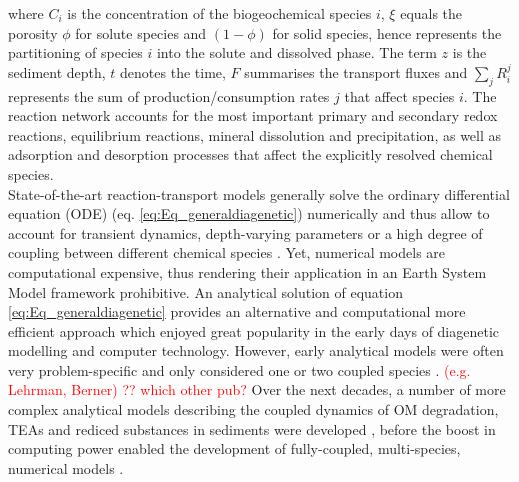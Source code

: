 \documentclass[gmd, manuscript]{copernicus}
\begin{document}
where $C_i$ is the concentration of the biogeochemical species $i$, $\xi$ equals the porosity $\phi$ for solute species and $(1-\phi)$ for solid species, hence represents the partitioning of species $i$ 
into the solute and dissolved phase. The term $z$ is the sediment depth, $t$ denotes the time, $F$ summarises the transport fluxes and $\sum_j R_i^j$ represents the sum of production/consumption rates $j$ 
that affect species $i$. The reaction network accounts for the most important primary and secondary redox reactions, equilibrium reactions, mineral dissolution and precipitation, as well as adsorption 
and desorption processes that affect the explicitly resolved chemical species.\\
State-of-the-art reaction-transport models generally solve the ordinary differential equation (ODE) (eq. \ref{eq:Eq_generaldiagenetic}) numerically and thus allow to account for transient dynamics, 
depth-varying parameters or a high degree of coupling between different chemical species \citep[e.g.][]{soetaert_model_1996, aguilera_knowledge-based_2005}. 
Yet, numerical models are computational expensive, thus rendering their application in an Earth System Model framework prohibitive. An analytical solution of equation \eqref{eq:Eq_generaldiagenetic} 
provides an alternative and computational more efficient approach which enjoyed great popularity in the early days of diagenetic modelling and computer technology. %
However, early analytical models were often very problem-specific and only considered one or two coupled species \citep[e.g.][]{berner_idealized_1964}. \textcolor{red}{(e.g. Lehrman, Berner) ?? which other pub?}
Over the next decades, a number of more complex analytical models describing the coupled dynamics of OM degradation, TEAs and rediced substances in sediments were developed \citep[e.g.][]{billen1982modelling, goloway1982diagenetic, jahnke1982model}, 
before the boost in computing power enabled the development of fully-coupled, multi-species, numerical models \citep[e.g.][]{van1995metal, soetaert_model_1996}. 
\end{document}

